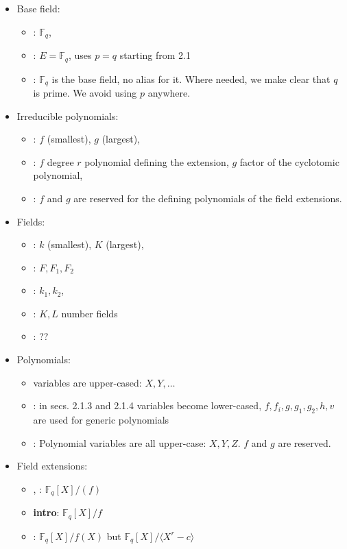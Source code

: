 \documentclass[12pt]{article}
\theoremstyle{plain}
\theoremstyle{definition}
\newcommand{\ang}[1]{\langle#1\rangle}
\def\F{\ensuremath{\mathbb{F}}}
\begin{document}
\begin{itemize}
\item Base field: 
  \begin{itemize}
  \item \cons: $\F_q$,
  \item \kummer: $E=\F_q$, uses $p=q$ starting from 2.1
  \item \prop: $\F_q$ is the base field, no alias for it. Where
    needed, we make clear that $q$ is prime. We avoid using $p$
    anywhere.
  \end{itemize}
\item Irreducible polynomials:
  \begin{itemize}
  \item \poster: $f$ (smallest), $g$ (largest),
  \item \kummer: $f$ degree $r$ polynomial defining the extension, $g$
    factor of the cyclotomic polynomial,
  \item \prop: $f$ and $g$ are reserved for the defining polynomials of the
    field extensions.
  \end{itemize}
\item Fields:
  \begin{itemize}
  \item \poster: $k$ (smallest), $K$ (largest),
  \item \kummer: $F,F_1,F_2$ 
  \item \rains: $k_1,k_2$, 
  \item \rains: $K,L$ number fields
  \item \prop: ??
  \end{itemize}
\item Polynomials: 
  \begin{itemize}
  \item \cons{} variables are upper-cased: $X,Y,\dots$
  \item \kummer: in secs. 2.1.3 and 2.1.4 variables become lower-cased,
    $f,f_i,g,g_1,g_2,h,v$ are used for generic polynomials
  \item \prop: Polynomial variables are all upper-case: $X,Y,Z$. $f$ and $g$ are reserved.
  \end{itemize}
\item Field extensions:
  \begin{itemize}
  \item \poster, \rains: $\F_q[X]/(f)$
  \item \textbf{intro}: $\F_q[X]/f$
  \item \kummer: $\F_q[X]/f(X)$ but $\F_q[X]/\ang{X^r-c}$

\end{itemize}
\end{itemize}
\end{document}
